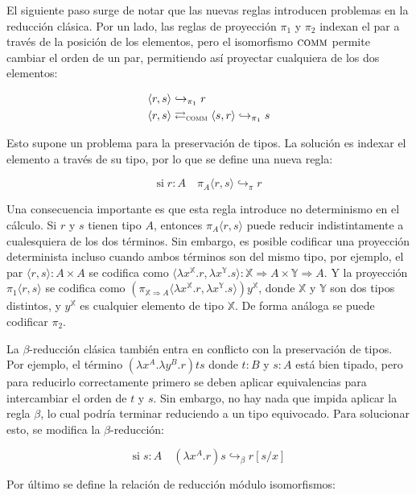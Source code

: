 El siguiente paso surge de notar que las nuevas reglas introducen problemas en la reducción clásica.
Por un lado, las reglas de proyección $\pi_1$ y $\pi_2$ indexan el par a través de la posición de los elementos, pero el isomorfismo $\textsc{comm}$ permite cambiar el orden de un par, permitiendo así proyectar cualquiera de los dos elementos:

\begin{align*}
	\langle r, s \rangle& \hookrightarrow_{\pi_1} r \\
	\langle r, s \rangle& \rightleftarrows_{\textsc{comm}} \langle s, r \rangle \hookrightarrow_{\pi_1} s
\end{align*}

Esto supone un problema para la preservación de tipos.
La solución es indexar el elemento a través de su tipo, por lo que se define una nueva regla:

\[ \text{si} \; r:A \quad \pi_A \langle r, s \rangle \hookrightarrow_{\pi} r \]

Una consecuencia importante es que esta regla introduce no determinismo en el cálculo.
Si $r$ y $s$ tienen tipo $A$, entonces $\pi_A \langle r, s \rangle$ puede reducir indistintamente a cualesquiera de los dos términos.
Sin embargo, es posible codificar una proyección determinista incluso cuando ambos términos son del mismo tipo, por ejemplo, el par $\langle r, s \rangle: A \times A$
se codifica como $\langle \lambda x^\mathbb{X}.r, \lambda x^\mathbb{Y}.s \rangle : \mathbb{X} \Rightarrow A \times \mathbb{Y} \Rightarrow A$.
Y la proyección $\pi_1 \langle r, s \rangle$ se codifica como $(\pi_{\mathbb{X} \Rightarrow A} \langle \lambda x^\mathbb{X}.r, \lambda x^\mathbb{Y}.s \rangle) y^\mathbb{X}$, donde $\mathbb{X}$ y $\mathbb{Y}$ son dos tipos distintos, y $y^\mathbb{X}$ es cualquier elemento de tipo $\mathbb{X}$.
De forma análoga se puede codificar $\pi_2$.


La $\beta$-reducción clásica también entra en conflicto con la preservación de tipos.
Por ejemplo, el término $(\lambda x^A . \lambda y^B . r)ts$ donde $t:B$ y $s:A$ está bien tipado, pero para reducirlo correctamente primero se deben aplicar equivalencias para intercambiar el orden de $t$ y $s$.
Sin embargo, no hay nada que impida aplicar la regla $\beta$, lo cual podría terminar reduciendo a un tipo equivocado.
Para solucionar esto, se modifica la $\beta$-reducción:

\[ \text{si} \; s:A \quad (\lambda x^A.r) s \hookrightarrow_{\beta} r[s/x] \]

Por último se define la relación de reducción módulo isomorfismos:

